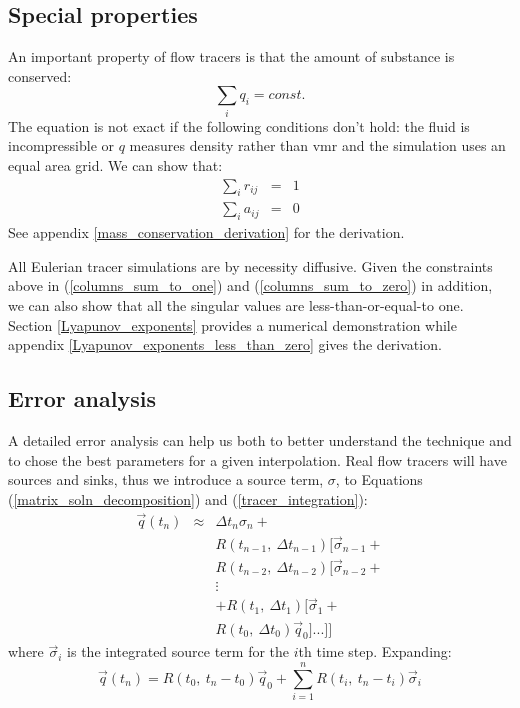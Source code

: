 \documentclass{article}
\begin{document}
\subsection{Special properties}

An important property of flow tracers is that the amount of substance is 
conserved:
\begin{equation}
\sum_i q_i = const.
\end{equation}
The equation is not exact if the following conditions don't hold:
the fluid is incompressible or $q$ measures
density rather than vmr and the simulation uses an equal area grid. 
We can show that:
\begin{eqnarray}
\sum_i r_{ij} & = & 1 
\label{columns_sum_to_one}\\
\sum_i a_{ij} & = & 0
\label{columns_sum_to_zero}
\end{eqnarray}
See appendix \ref{mass_conservation_derivation} for the derivation.

All Eulerian tracer simulations are by necessity diffusive. 
Given the constraints above in (\ref{columns_sum_to_one}) and
(\ref{columns_sum_to_zero}) in addition, 
we can also show that all the singular values are less-than-or-equal-to one.
Section \ref{Lyapunov_exponents} provides a numerical demonstration while 
appendix \ref{Lyapunov_exponents_less_than_zero} gives the derivation.

\subsection{Error analysis}

A detailed error analysis can help us both to better understand the technique
and to chose the best parameters for a given interpolation.
Real flow tracers will have sources and sinks, thus we introduce a source
term, $\sigma$, to Equations (\ref{matrix_soln_decomposition})
and (\ref{tracer_integration}):
\begin{eqnarray}
	  \vec q(t_n) 
  & \approx & \Delta t_{n} \sigma_{n} + \nonumber \\
  & & R(t_{n-1}, ~ \Delta t_{n-1}) [\vec \sigma_{n-1} + \nonumber \\
  & & R(t_{n-2}, ~ \Delta t_{n-2}) [\vec \sigma_{n-2} + \nonumber \\
  & & \vdots \nonumber \\
  & & + R(t_1, ~ \Delta t_1) [\vec \sigma_1 + \nonumber \\
  & & R(t_0, ~ \Delta t_0) \vec q_0 ]...]]
\end{eqnarray}
where $\vec \sigma_i$ is the integrated source term for the $i$th time step.
Expanding:
\begin{equation}
\vec q(t_n) 
   = R(t_0,~t_n-t_0) \vec q_0 + \sum_{i=1}^{n} R(t_i,~t_n-t_i) \vec \sigma_i
  \label{sources_sinks}
\end{equation}
\end{document}
